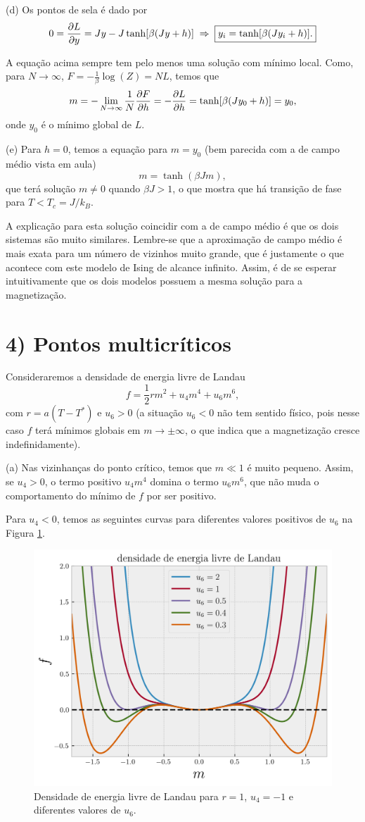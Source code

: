 \documentclass[a4paper,10pt]{article}
\begin{document}
(d) Os pontos de sela é dado por
$$
0 = \pdv{L}{y} = Jy - J \tanh[\beta(Jy + h)] \; \Rightarrow \; \boxed{ y_i = \tanh[\beta(Jy_i + h)]. }
$$

A equação acima sempre tem pelo menos uma solução com mínimo local. Como, para $N\to\infty$, $F = -\frac{1}{\beta} \log(Z) = N L$, temos que
$$
m = -\lim_{N\to\infty} \frac{1}{N} \pdv{F}{h} = - \pdv{L}{h} = \tanh[\beta(J y_0 + h)] = y_0,
$$
onde $y_0$ é o mínimo global de $L$.

\n

(e) Para $h = 0$, temos a equação para $m = y_0$ (bem parecida com a de campo médio vista em aula)
$$
m = \tanh(\beta J m),
$$
que terá solução $m\neq 0$ quando $\beta J > 1$, o que mostra que há transição de fase para $T < T_c = J / k_B$.

\n

A explicação para esta solução coincidir com a de campo médio é que os dois sistemas são muito similares. Lembre-se que a aproximação de campo médio é mais exata para um número de vizinhos muito grande, que é justamente o que acontece com este modelo de Ising de alcance infinito. Assim, é de se esperar intuitivamente que os dois modelos possuem a mesma solução para a magnetização.


\pagebreak

\section*{4) Pontos multicríticos}

Consideraremos a densidade de energia livre de Landau
$$
f = \frac{1}{2} r m^2 + u_4 m^4 + u_6 m^6,
$$
com $r = a(T-T^*)$ e $u_6 > 0$ (a situação $u_6 < 0$ não tem sentido físico, pois nesse caso $f$ terá mínimos globais em $m \to \pm \infty$, o que indica que a magnetização cresce indefinidamente).

\n

(a) Nas vizinhanças do ponto crítico, temos que $m \ll 1$ é muito pequeno. Assim, se $u_4 > 0$, o termo positivo $u_4 m^4$ domina o termo $u_6 m^6$, que não muda o comportamento do mínimo de $f$ por ser positivo.

\n

Para $u_4 < 0$, temos as seguintes curvas para diferentes valores positivos de $u_6$ na Figura \ref{fig:landau-free}.
\begin{figure}[H]
\centering
\includegraphics[width=0.6\linewidth]{fig/landau-free_energy.png}
\caption{Densidade de energia livre de Landau para $r = 1$, $u_4 = -1$ e diferentes valores de $u_6$.}
\label{fig:landau-free}
\end{figure}
\end{document}
